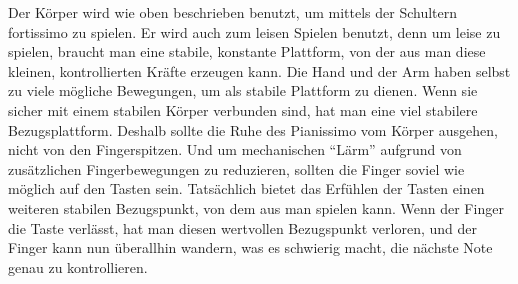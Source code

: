 Der Körper wird wie oben beschrieben benutzt, um mittels der Schultern fortissimo zu spielen.
Er wird auch zum leisen Spielen benutzt, denn um leise zu spielen, braucht man eine stabile, konstante Plattform, von der aus man diese kleinen, kontrollierten Kräfte erzeugen kann.
Die Hand und der Arm haben selbst zu viele mögliche Bewegungen, um als stabile Plattform zu dienen.
Wenn sie sicher mit einem stabilen Körper verbunden sind, hat man eine viel stabilere Bezugsplattform.
Deshalb sollte die Ruhe des Pianissimo vom Körper ausgehen, nicht von den Fingerspitzen.
Und um mechanischen \enquote{Lärm} aufgrund von zusätzlichen Fingerbewegungen zu reduzieren, sollten die Finger soviel wie möglich auf den Tasten sein.
Tatsächlich bietet das Erfühlen der Tasten einen weiteren stabilen Bezugspunkt, von dem aus man spielen kann.
Wenn der Finger die Taste verlässt, hat man diesen wertvollen Bezugspunkt verloren, und der Finger kann nun überallhin wandern, was es schwierig macht, die nächste Note genau zu kontrollieren.




